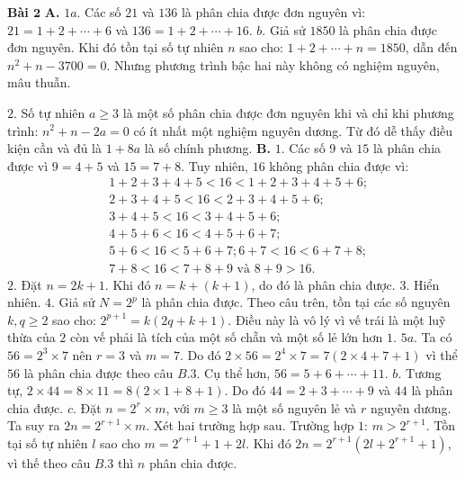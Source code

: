 \begin{multicols}{2}
	\vskip 0.05cm
	\textbf{\color{cackithi}Bài $\pmb{2}$} 
	\vskip 0.05cm
	\textbf{\color{cackithi} A.} $1a$. Các số $21$ và $136$ là phân chia được đơn nguyên vì: $21=1+2 + \cdots +6$ và $136=1+2+\cdots + 16$.
	\vskip 0.05cm 
	$b.$ Giả sử $1850$ là phân chia được đơn nguyên. Khi đó tồn tại số tự nhiên $n$ sao cho: 
	$1+2+\cdots+n=1850$,
dẫn đến $n^2+n-3700=0$. Nhưng phương trình bậc hai này không có nghiệm nguyên, mâu thuẫn. 

\vskip 0.05cm
$2.$ Số tự nhiên $a\ge 3$ là một số phân chia được đơn nguyên khi và chỉ khi phương trình: $n^2+n-2a=0$ có ít nhất một nghiệm nguyên dương. Từ đó dễ thấy điều kiện cần và đủ là $1+8a$ là số chính phương.
\vskip 0.05cm  
\textbf{\color{cackithi} B.}
$1.$ Các số $9$ và $15$ là phân chia được vì $9=4+5$ và $15=7+8$. Tuy nhiên, $16$ không phân chia được vì:
\begin{align*}
&1\!+\!2\!+\!3\!+\!4\!+\!5\!<\!16\!<\!1\!+\!2\!+\!3\!+\!4\!+\!5\!+\!6;\\
&2+3+4+5<16<2+3+4+5+6;\\
&3+4+5<16<3+4+5+6;\\
&4+5+6<16<4+5+6+7;\\
&5\!+\!6\!<\!16\!<\!5\!+\!6\!+\!7; 6\!+\!7\!<\!16\!<\!6\!+\!7\!+\!8;\\
&7+8<16<7+8+9 \text{ và } 8+9>16.
\end{align*}
$2.$ Đặt $n=2k+1$. Khi đó $n=k+(k+1)$, do đó là phân chia được.
\vskip 0.05cm  
$3.$ Hiển nhiên.
\vskip 0.05cm
$4.$ Giả sử $N=2^p$ là phân chia được. Theo câu trên, tồn tại các số nguyên $k, q\ge 2$ sao cho: $2^{p+1}=k(2q+k+1)$. Điều này là vô lý vì vế trái là một luỹ thừa của $2$ còn vế phải là tích của một số chẵn và một số lẻ lớn hơn $1$. 
\vskip 0.05cm
$5a.$ Ta có $56=2^3\times7$ nên $r=3$ và $m=7$. Do đó $2\times 56=2^4\times7=7(2\times 4+7+1)$ vì thể $56$ là phân chia được theo câu $B.3$. Cụ thể hơn, $56=5+6+ \cdots + 11$. 
\vskip 0.05cm
$b.$ Tương tự, $2\times 44=8\times11=8(2\times1+8+1)$. Do đó $44=2+3+\cdots + 9$ và $44$ là phân chia được.
\vskip 0.05cm 
$c.$  Đặt $n=2^r\times m$, với $m\ge 3$ là một số nguyên lẻ  và $r$ nguyên dương. Ta suy ra $2n=2^{r+1}\times m$.  Xét hai trường hợp sau. 
\vskip 0.05cm
Trường hợp $1$: $m>2^{r+1}$. Tồn tại số tự nhiên $l$ sao cho $m=2^{r+1}+1+2l$. Khi đó $2n=2^{r+1}(2l+2^{r+1}+1)$, vì thế theo câu $B.3$ thì $n$ phân chia được. 
\vskip 0.05cm

\end{multicols}
